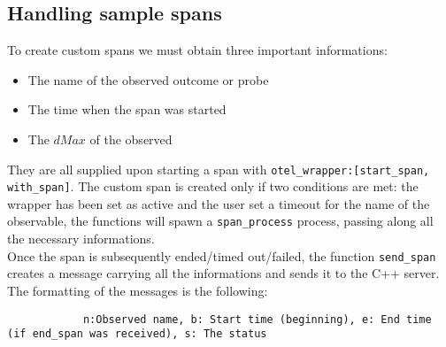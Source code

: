     \subsection{Handling sample spans}
        To create custom spans we must obtain three important informations:
        \begin{itemize}
            \item The name of the observed outcome or probe
            \item The time when the span was started
            \item The $dMax$ of the observed
        \end{itemize}
        
        They are all supplied upon starting a span with \texttt{otel\_wrapper:[start\_span, with\_span]}. The custom span is created only if two conditions are met: the wrapper has been set as active and the user set a timeout for the name of the observable, the functions will spawn a \texttt{span\_process} process, passing along all the necessary informations. \\
        Once the span is subsequently ended/timed out/failed, the function \texttt{send\_span} creates a message carrying all the informations and sends it to the C++ server. The formatting of the messages is the following:
        \begin{verbatim}
            n:Observed name, b: Start time (beginning), e: End time (if end_span was received), s: The status
        \end{verbatim}
